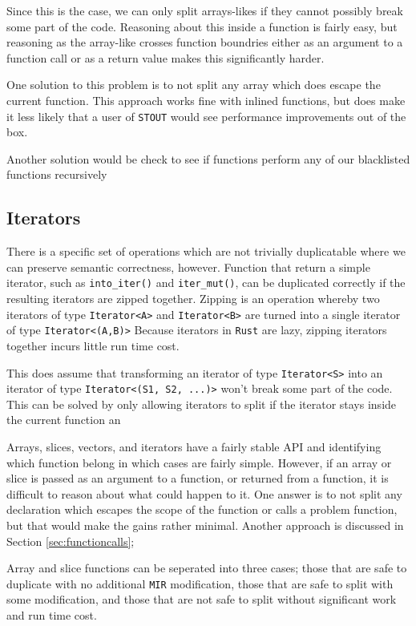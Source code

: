 \documentclass[12pt,oneside]{book}
\newcommand{\rustname}{{\texttt{Rust}}}
\def \rust {\rustname{}\xspace}
\newcommand{\mirname}{{\texttt{MIR}}}
\def \mir {\mirname{}\xspace}
\newcommand{\projectname}{{\texttt{STOUT}}}
\def \name{\projectname\xspace}
\begin{document}
Since this is the case, we can only split arrays-likes if they cannot possibly
break some part of the code. Reasoning about this inside a function is 
fairly easy, but reasoning as the array-like crosses function boundries 
either as an argument to a function call or as a return value makes
this significantly harder. 

One solution to this problem is
to not split any array which does escape the current function.
This approach works fine with inlined functions, but
does make it less likely that a user of \name would see 
performance improvements out of the box.

Another solution would be check to see if functions perform any of our
blacklisted functions recursively

\subsection{Iterators}
There is a specific set of operations which are not trivially duplicatable
where we can preserve semantic correctness, however. 
Function that return a simple iterator, such as 
\texttt{into\_iter()} and \texttt{iter\_mut()}, can be duplicated correctly
if the resulting iterators are zipped together. 
Zipping is an operation whereby
two iterators of type \texttt{Iterator<A>} and \texttt{Iterator<B>}
are turned into a single iterator of type \texttt{Iterator<(A,B)>}
Because iterators in \rust are lazy, zipping iterators together incurs 
little run time cost.

This does assume that transforming an iterator of type \texttt{Iterator<S>}
into an iterator of type \texttt{Iterator<(S1, S2, ...)>} won't break 
some part of the code. This can be solved by only allowing iterators to 
split if the iterator stays inside the current function an


Arrays, slices, vectors, and iterators have a fairly stable API and 
identifying which function belong in which cases are fairly simple. 
However, if an array or slice is passed as an argument to a function,
or returned from a function, it is difficult to reason about what 
could happen to it. One answer is to not split any declaration which
escapes the scope of the function or calls a problem function, but 
that would make the gains rather minimal. Another approach is discussed 
in Section \ref{sec:functioncalls};

Array and slice functions can be seperated into three cases; those that
are safe to duplicate with no additional \mir modification,
those that are safe to split with some modification, 
and those that are not safe to split
without significant work and run time cost.
\end{document}
